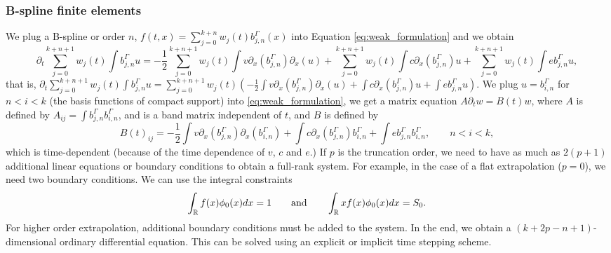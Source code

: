 \documentclass[a4paper]{article}
\newcommand{\1}{\textbf{1}}
\newcommand{\R}{\mathbb{R}}
\begin{document}
\subsubsection*{B-spline finite elements}
\par We plug a B-spline or order $n$, $f(t,x) = \sum\limits_{j = 0}^{k + n} w_j(t) b^\Gamma_{j, n}(x)$ into Equation \eqref{eq:weak_formulation} and we obtain
$$
\partial_t \sum\limits_{j = 0}^{k + n + 1} w_j(t) \int b^\Gamma_{j, n} u = -\frac{1}{2} \sum\limits_{j = 0}^{k + n + 1} w_j(t) \int v \partial_x \left(b^\Gamma_{j, n}\right) \partial_x (u) + \sum\limits_{j = 0}^{k + n + 1} w_j(t) \int c \partial_x \left(b^\Gamma_{j, n}\right) u + \sum\limits_{j = 0}^{k + n + 1} w_j(t)\int e b^\Gamma_{j, n} u,
$$
that is, $\partial_t \sum\limits_{j = 0}^{k + n + 1} w_j(t) \int b^\Gamma_{j, n} u = \sum\limits_{j = 0}^{k + n + 1} w_j(t) \left( -\frac{1}{2} \int v \partial_x \left(b^\Gamma_{j, n}\right) \partial_x (u) + \int c \partial_x \left(b^\Gamma_{j, n}\right) u + \int e b^\Gamma_{j, n} u \right)$.
We plug $u = b^\Gamma_{i, n}$ for $n < i < k$ (the basis functions of compact support) into \eqref{eq:weak_formulation}, we get a matrix equation $A \partial_t w = B(t) w$, where $A$ is defined by $A_{ij} = \int b^\Gamma_{j, n} b^\Gamma_{i, n}$, and is a band matrix independent of $t$, and $B$ is defined by
$$
B(t)_{ij} = -\frac{1}{2} \int v \partial_x \left(b^\Gamma_{j, n}\right) \partial_x (b^\Gamma_{i, n}) + \int c \partial_x \left(b^\Gamma_{j, n}\right) b^\Gamma_{i, n} + \int e b^\Gamma_{j, n} b^\Gamma_{i, n}, \qquad n < i < k,
$$ 
which is time-dependent (because of the time dependence of $v$, $c$ and $e$.)
If $p$ is the truncation order, we need to have as much as $2 (p + 1)$ additional linear equations or boundary conditions to obtain a full-rank system. For example, in the case of a flat extrapolation ($p = 0$), we need two boundary conditions. We can use the integral constraints
\begin{equation}\label{eq:integral_conditions}
\int_\R f(x) \phi_0(x)dx = 1 \qquad \textnormal{and} \qquad \int_\R x f(x) \phi_0 (x)dx = S_0.
\end{equation}
For higher order extrapolation, additional boundary conditions must be added to the system. In the end, we obtain a $(k + 2 p - n + 1)$-dimensional ordinary differential equation. This can be solved using an explicit or implicit time stepping scheme. 
\end{document}
